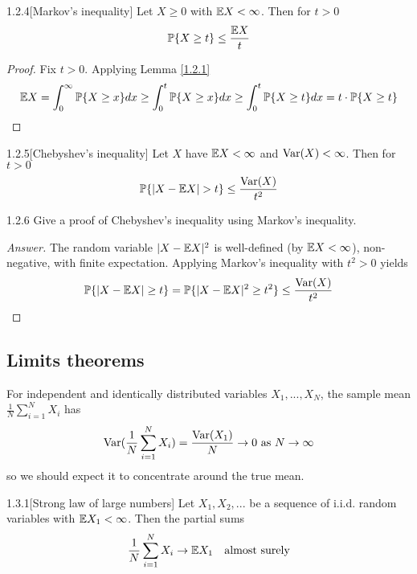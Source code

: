 
\begin{prop}{1.2.4}[Markov's inequality]\label{1.2.4}
Let $X \geq 0$ with $\mathbb{E} X < \infty$. Then for $t > 0$
\begin{align*}
    \mathbb{P} \{ X \geq t\} \leq \frac{\mathbb{E} X} t
\end{align*}
\end{prop}

\begin{proof}
Fix $t>0$. Applying Lemma \ref{1.2.1}
\begin{align*}
    \mathbb{E} X = \int_0^\infty \mathbb{P}\{X \geq x\} dx \geq \int_0^t \mathbb{P}\{X \geq x\} dx \geq \int_0^t \mathbb{P}\{X \geq t\} dx = t\cdot\mathbb{P}\{X \geq t\}
\end{align*}
\end{proof}

\begin{cor}{1.2.5}[Chebyshev's inequality]\label{1.2.5}
Let $X$ have $\mathbb{E} X <\infty$ and $\text{Var}(X) <\infty$. Then for $t > 0$
\begin{align*}
    \mathbb{P} \{ |X -\mathbb{E} X| > t\} \leq \frac{\text{Var}(X)} {t^2}
\end{align*}
\end{cor}

\begin{ex}{1.2.6}\label{1.2.6}
Give a proof of Chebyshev's inequality using Markov's inequality.
\end{ex}
\begin{proof}[Answer]
The random variable $|X - \mathbb{E} X|^2$ is well-defined (by $\mathbb{E} X < \infty$), non-negative, with finite expectation. 
Applying Markov's inequality with $t^2>0$ yields
\begin{align*}
    \mathbb{P} \{|X -\mathbb{E} X| \geq t\} =
    \mathbb{P} \{|X -\mathbb{E} X|^2 \geq t^2\} \leq \frac {\text{Var}(X)}{t^2}
\end{align*}
\end{proof}

\subsection{Limits theorems}

For independent and identically distributed variables $X_1,...,X_N$, the sample mean $\frac1N \sum_{i=1}^N X_i$ has 
\begin{align*}
    \text{Var}(\frac1N\sum_{i=1}^N X_i) = \frac {\text{Var}(X_1)} N \to 0 \text{ as $N\to \infty$}
\end{align*}
so we should expect it to concentrate around the true mean.

\begin{thm}{1.3.1}[Strong law of large numbers]\label{1.3.1}
Let $X_1, X_2,...$ be a sequence of i.i.d. random variables with $\mathbb{E} X_1 < \infty$. Then the partial sums
\begin{align*}
    \frac 1 N \sum_{i=1}^N X_i \to \mathbb{E} X_1 \quad\text{almost surely}
\end{align*}
\end{thm}